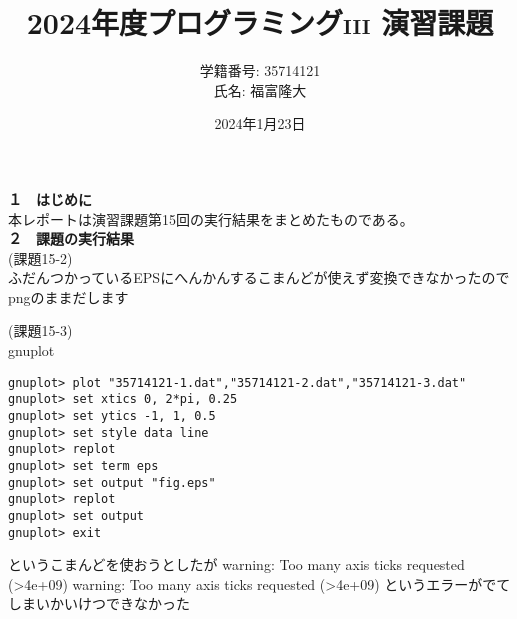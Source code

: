 \documentclass[a4j]{jsarticle}
\title{2024年度プログラミング\textsc{iii} 演習課題}
\author{学籍番号: 35714121 \\ 氏名: 福富隆大}
\date{2024年1月23日}
\begin{document}
\maketitle

\textbf{１　はじめに} \\

本レポートは演習課題第15回の実行結果をまとめたものである。\\

\textbf{２　課題の実行結果} \\

\textmd{(課題15-2)} \\


ふだんつかっているEPSにへんかんするこまんどが使えず変換できなかったのでpngのままだします

\textmd{(課題15-3)} \\

gnuplot
\begin{lstlisting}[basicstyle=\ttfamily\footnotesize, frame=single]
% gnuplot <Enter>
gnuplot> plot "35714121-1.dat","35714121-2.dat","35714121-3.dat"
gnuplot> set xtics 0, 2*pi, 0.25
gnuplot> set ytics -1, 1, 0.5
gnuplot> set style data line
gnuplot> replot
gnuplot> set term eps
gnuplot> set output "fig.eps"
gnuplot> replot
gnuplot> set output
gnuplot> exit
\end{lstlisting}
というこまんどを使おうとしたが
warning: Too many axis ticks requested (>4e+09)
warning: Too many axis ticks requested (>4e+09)
というエラーがでてしまいかいけつできなかった
\end{document}
